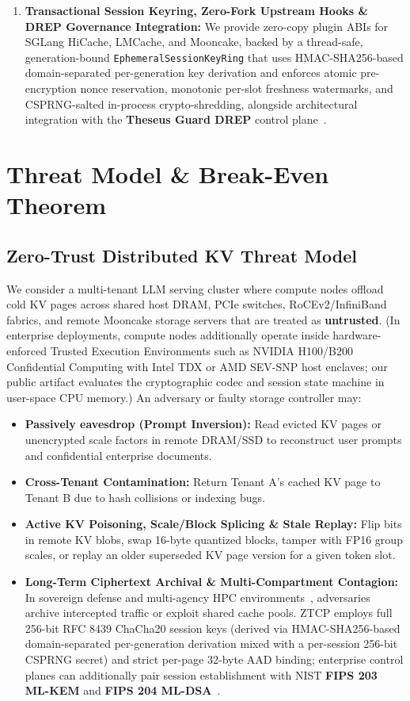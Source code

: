 \documentclass[10pt,twocolumn]{article}
\begin{document}
\begin{enumerate}
    \item \textbf{Transactional Session Keyring, Zero-Fork Upstream Hooks \& DREP Governance Integration:} We provide zero-copy plugin ABIs for SGLang HiCache, LMCache, and Mooncake, backed by a thread-safe, generation-bound \texttt{EphemeralSessionKeyRing} that uses HMAC-SHA256-based domain-separated per-generation key derivation and enforces atomic pre-encryption nonce reservation, monotonic per-slot freshness watermarks, and CSPRNG-salted in-process crypto-shredding, alongside architectural integration with the \textbf{Theseus Guard DREP} control plane~\cite{theseusguard2026patent,theseusguard2026g1}.
\end{enumerate}

\section{Threat Model \& Break-Even Theorem}

\subsection{Zero-Trust Distributed KV Threat Model}
We consider a multi-tenant LLM serving cluster where compute nodes offload cold KV pages across shared host DRAM, PCIe switches, RoCEv2/InfiniBand fabrics, and remote Mooncake storage servers that are treated as \textbf{untrusted}. (In enterprise deployments, compute nodes additionally operate inside hardware-enforced Trusted Execution Environments such as NVIDIA H100/B200 Confidential Computing with Intel TDX or AMD SEV-SNP host enclaves; our public artifact evaluates the cryptographic codec and session state machine in user-space CPU memory.) An adversary or faulty storage controller may:
\begin{itemize}
    \item \textbf{Passively eavesdrop (Prompt Inversion):} Read evicted KV pages or unencrypted scale factors in remote DRAM/SSD to reconstruct user prompts and confidential enterprise documents.
    \item \textbf{Cross-Tenant Contamination:} Return Tenant A's cached KV page to Tenant B due to hash collisions or indexing bugs.
    \item \textbf{Active KV Poisoning, Scale/Block Splicing \& Stale Replay:} Flip bits in remote KV blobs, swap 16-byte quantized blocks, tamper with FP16 group scales, or replay an older superseded KV page version for a given token slot.
    \item \textbf{Long-Term Ciphertext Archival \& Multi-Compartment Contagion:} In sovereign defense and multi-agency HPC environments~\cite{damar2023hybrid}, adversaries archive intercepted traffic or exploit shared cache pools. ZTCP employs full 256-bit RFC 8439 ChaCha20 session keys (derived via HMAC-SHA256-based domain-separated per-generation derivation mixed with a per-session 256-bit CSPRNG secret) and strict per-page 32-byte AAD binding; enterprise control planes can additionally pair session establishment with NIST \textbf{FIPS 203 ML-KEM} and \textbf{FIPS 204 ML-DSA}~\cite{nist2024pqc}.
\end{itemize}
\end{document}
